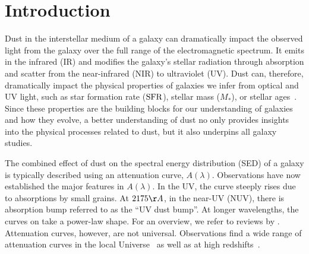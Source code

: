 \section{Introduction} \label{sec:intro} 
Dust in the interstellar medium of a galaxy can dramatically impact the
observed light from the galaxy over the full range of the electromagnetic spectrum. 
It emits in the infrared (IR) and modifies the galaxy's stellar radiation
through absorption and scatter from the near-infrared (NIR) to ultraviolet
(UV). Dust can, therefore, dramatically impact the physical properties of
galaxies we infer from optical and UV light, such as star
formation rate (${\rm SFR}$), stellar mass ($M_*$), or stellar ages~\citep[see
reviews by][]{walcher2011, conroy2013}. Since these properties are the
building blocks for our understanding of galaxies and how they evolve,
a better understanding of dust no only provides insights into the physical
processes related to dust, but it also underpins all galaxy studies.  

The combined effect of dust on the spectral energy distribution (SED) of a
galaxy is typically described using an attenuation curve, $A(\lambda)$.
Observations have now established the major features in $A(\lambda)$. In the UV, the 
curve steeply rises due to absorptions by small grains. At $2175\AA$, in the 
near-UV (NUV), there is absorption bump referred to as the ``UV dust bump''. 
At longer wavelengths, the curves on take a power-law shape. For an overview, we 
refer to reviews by \cite{calzetti2001, draine2003, galliano2018}. Attenuation
curves, however, are not universal. Observations find a wide range of
attenuation curves in the local Universe~\citep{wild2011, battisti2017,
salim2018, salim2020} as well as at high redshifts~\citep[\eg][]{reddy2015,
salmon2016}.

